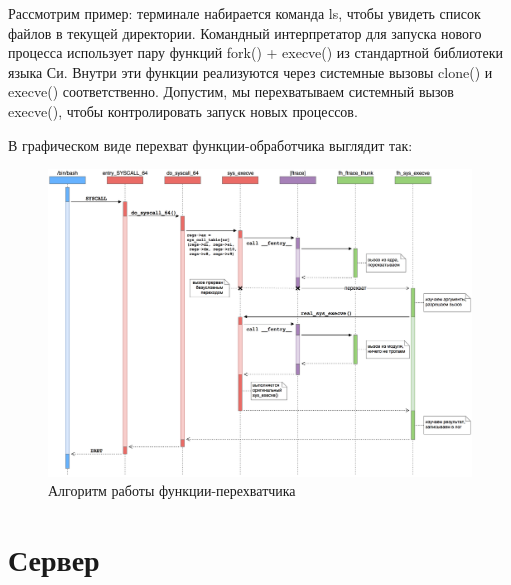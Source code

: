 Рассмотрим пример: терминале набирается команда ls, чтобы увидеть список файлов в текущей директории. Командный интерпретатор для запуска нового процесса использует пару функций fork() + execve() из стандартной библиотеки языка Си. Внутри эти функции реализуются через системные вызовы clone() и execve() соответственно. Допустим, мы перехватываем системный вызов execve(), чтобы контролировать запуск новых процессов.

В графическом виде перехват функции-обработчика выглядит так:
\begin{figure}[h!]
	\centering
	\includegraphics[width=1.0\textwidth]{img/hook_work_scheme.png}
	\caption{Алгоритм работы функции-перехватчика}
	\label{fig:spire00}
\end{figure}

\section{Сервер}



